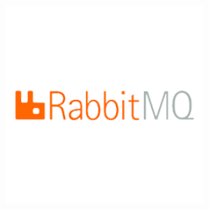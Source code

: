 \documentclass[a0,portrait]{a0poster}
\begin{document}
\begin{multicols}{2}
\begin{center}
\begin{minipage}[t]{0.32\linewidth}
    \end{minipage}
\begin{minipage}[t]{0.32\linewidth}
    \includegraphics[width=75mm]{rabbitmq}
\end{minipage}
\end{center}










\color{HoGentAccent1} 

\end{multicols}
\end{document}
